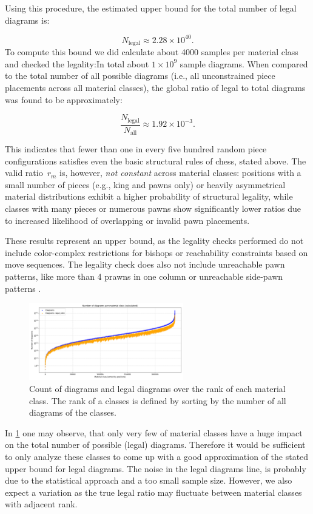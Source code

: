 \documentclass[12pt]{article}
\begin{document}
Using this procedure, the estimated upper bound for the total number of legal diagrams is:

\[
N_{\text{legal}} \approx 2.28 \times 10^{40}.
\]
To compute this bound we did calculate about 4000 samples per material class and checked the legality:In total about $1\times 10^{9}$ sample diagrams.
\noindent
When compared to the total number of all possible diagrams (i.e., all unconstrained piece placements across all material classes), the global ratio of legal to total diagrams was found to be approximately:

\[
\frac{N_{\text{legal}}}{N_{\text{all}}} \approx 1.92 \times 10^{-3}.
\]

This indicates that fewer than one in every five hundred random piece configurations satisfies even the basic structural rules of chess, stated above.
The valid ratio~$r_m$ is, however, \emph{not constant} across material classes: positions with a small number of pieces (e.g., king and pawns only) or heavily asymmetrical material distributions exhibit a higher probability of structural legality, while classes with many pieces or numerous pawns show significantly lower ratios due to increased likelihood of overlapping or invalid pawn placements.

These results represent an upper bound, as the legality checks performed do not include color-complex restrictions for bishops or reachability constraints based on move sequences. The legality check does also not include unreachable pawn patterns, like more than 4 prawns in one column or unreachable side-pawn patterns \cite{mcdonagh2022}.

\begin{figure}[h!]
  \centering
  \includegraphics[width=0.6\textwidth]{positions_per_class.png}
  \caption{Count of diagrams and legal diagrams over the rank of each material class. The rank of a classes is defined by sorting by the number of all diagrams of the classes.}
  \label{fig:diagrams_per_class}
\end{figure}
In \ref{fig:diagrams_per_class} one may observe, that only very few of material classes have a huge impact on the total number of possible (legal) diagrams. Therefore it would be sufficient to only analyze these classes to come up with a good approximation of the stated upper bound for legal diagrams. The noise in the legal diagrams line, is probably due to the statistical approach and a too small sample size. However, we also expect a variation as the true legal ratio may fluctuate between material classes with adjacent rank.
\end{document}

